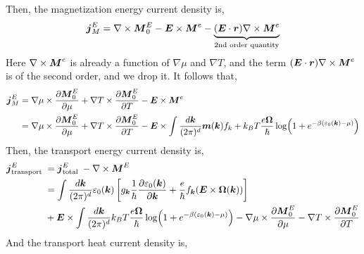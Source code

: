 \documentclass{report}
\renewcommand\vec[1]{\ensuremath\boldsymbol{#1}} %
\begin{document}
Then, the magnetization energy current density is,
$$
\begin{aligned}
	\vec{j}^E_M = \nabla \times \vec{M}_0^E - \vec{E} \times \vec{M}^e - \underbrace{(\vec{E} \cdot \vec{r}) \nabla \times \vec{M}^e}_{\text{2nd order quantity}}
\end{aligned}
$$
Here $\nabla \times \vec{M}^e$ is already a function of $\nabla \mu$ and $\nabla T$, and the term $(\vec{E} \cdot \vec{r}) \nabla \times \vec{M}^e$ is of the second order, and we drop it. It follows that, 
$$\begin{aligned}
	\vec{j}^E_M &= \nabla \mu \times \frac{\partial \vec{M}_{0}^{E}}{\partial \mu}+\nabla T \times \frac{\partial \vec{M}_{0}^{E}}{\partial T}-\vec{E} \times \vec{M}^{e}\\
	&= \nabla \mu \times \frac{\partial \vec{M}_{0}^{E}}{\partial \mu}+\nabla T \times \frac{\partial \vec{M}_{0}^{E}}{\partial T} -\vec{E} \times \int \frac{d\vec{k}}{(2\pi)^d} \vec{m}(\vec{k}) f_{k}+k_{B} T \frac{e \vec{\Omega}}{\hbar} \log(1 + e^{-\beta(\varepsilon_0(\vec{k}) - \mu)})
\end{aligned}$$
Then, the transport energy current density is,
$$
\begin{aligned}
	\vec{j}_{\text {transport }}^{E} &=\vec{j}_{\text {total }}^{E}-\nabla \times \vec{M}^{E} \\
	&=\int \frac{d\vec{k}}{(2\pi)^d} \varepsilon_0(\vec{k}) \left[ {g}_{\vec{k}} \frac{1}{\hbar} \frac{\partial \varepsilon_0(\vec{k})}{\partial \vec{k}} + \frac{e}{\hbar} {f}_{\vec{k}} (\vec{E}\times\vec{\Omega}(\vec{k}))\right] \\
	& + \vec{E} \times \int \frac{d\vec{k}}{(2\pi)^d}k_{B} T \frac{e \vec{\Omega}}{\hbar} \log(1 + e^{-\beta(\varepsilon_0(\vec{k}) - \mu)}) -\nabla \mu \times \frac{\partial \vec{M}_{0}^{E}}{\partial \mu}-\nabla T \times \frac{\partial \vec{M}_{0}^{E}}{\partial T}
\end{aligned}
$$
And the transport heat current density is,
\end{document}
